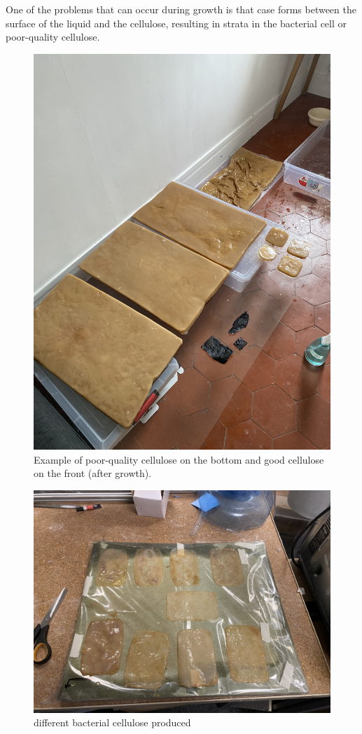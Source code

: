 One of the problems that can occur during growth is that case forms between the surface of the liquid and the cellulose, resulting in strata in the bacterial cell or poor-quality cellulose. 
\begin{figure}[h]
    \centering
    \includegraphics{images/IMG_3944.jpg}
    \caption{Example of poor-quality cellulose on the bottom and good cellulose on the front (after growth). }
    \label{fig:inde}
\end{figure} 

\begin{figure}[h]
    \centering
    \includegraphics{images/IMG_4567.jpg}
    \caption{different bacterial cellulose produced}
    \label{fig:roinside}
\end{figure} 


